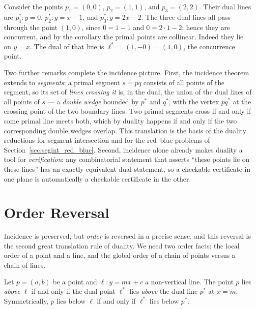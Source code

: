 \begin{example}\label{ex:geo_duality_collinearity}
  Consider the points $p_1 = (0,0)$, $p_2 = (1,1)$, and $p_3 = (2,2)$.
  Their dual lines are $p_1^* : y = 0$, $p_2^* : y = x - 1$, and
  $p_3^* : y = 2x - 2$. The three dual lines all pass through the point
  $(1,0)$, since $0 = 1 - 1$ and $0 = 2 \cdot 1 - 2$; hence they are
  concurrent, and by the corollary the primal points are collinear. Indeed
  they lie on $y = x$. The dual of that line is $\ell^* = (1, -0) = (1,0)$,
  the concurrence point.
\end{example}

Two further remarks complete the incidence picture. First, the incidence
theorem extends to \emph{segments}: a primal segment $s = pq$ consists of
all points of the segment, so its set of \emph{lines crossing it} is, in
the dual, the union of the dual lines of all points of $s$ --- a
\emph{double wedge} bounded by $p^*$ and $q^*$, with the vertex
$\overline{pq}^*$ at the crossing point of the two boundary lines. Two
primal segments cross if and only if some primal line meets both, which by
duality happens if and only if the two corresponding double wedges overlap.
This translation is the basis of the duality reductions for segment
intersection and for the red--blue problems of
Section~\ref{sec:segint_red_blue}. Second, incidence alone already makes
duality a tool for \emph{verification}: any combinatorial statement that
asserts ``these points lie on these lines'' has an exactly equivalent dual
statement, so a checkable certificate in one plane is automatically a
checkable certificate in the other.


\section{Order Reversal}
\label{sec:duality_order_reversal}

Incidence is preserved, but \emph{order} is reversed in a precise sense,
and this reversal is the second great translation rule of duality. We need
two order facts: the local order of a point and a line, and the global
order of a chain of points versus a chain of lines.

\begin{lemma}\label{lem:geo_duality_point_line_order}
  Let $p = (a,b)$ be a point and $\ell : y = mx + c$ a non-vertical line.
  The point $p$ lies \emph{above} $\ell$ if and only if the dual point
  $\ell^*$ lies \emph{above} the dual line $p^*$ at $x = m$. Symmetrically,
  $p$ lies below $\ell$ if and only if $\ell^*$ lies below $p^*$.
\end{lemma}

